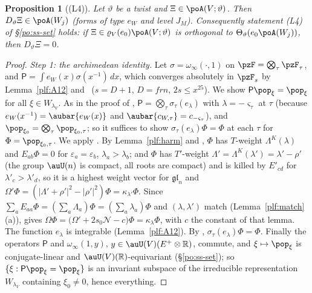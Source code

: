 \documentclass[10pt]{amsart}
\newtheorem{proposition}[theorem]{Proposition}
\theoremstyle{definition}
\theoremstyle{remark}
\newcommand{\R}{\mathbb R}
\begin{document}
\begin{proposition}[(L4)]\label{plf:L4}
Let $\vartheta$ be a twist and $\Xi\in\poA(V;\vartheta)$. Then $D_\vartheta\Xi\in\poA(W_j)$ (forms of
type $e_W$ and level $J_M$). Consequently statement {\rm(L4)} of \S\ref{po:ss-set} holds: if
$\Xi\in\varrho_V(e_0)\poA(V;\vartheta)$ is orthogonal to $\Theta_\vartheta(e_0\poA(W_j))$, then
$D_\vartheta\Xi=0$.
\end{proposition}
\begin{proof}
\emph{Step 1: the archimedean identity.} Let $\sigma=\omega_\infty(\cdot,1)$ on $\pzF=\bigotimes_\tau
\pzF_\tau$, and $\mathsf P=\int e_W(x)\sigma(x^{-1})\,dx$, which converges absolutely in $\pzF_s$ by
Lemma~\ref{plf:A12} and~{\cite[Lemma~8.2(a)]{P49}} ($s=D+1$, $D=frn$, $2s\le x^{25}$). We show
$\mathsf P\pop_\xi=\pop_\xi$ for all $\xi\in W_{\lambda_V}$. As in the proof of
{\cite[Theorem~3.15]{P49}}, $\mathsf P=\bigotimes_\tau\sigma_\tau(e_{\lambda})$ with $\lambda=-\varsigma_\tau$
at $\tau$ (because $e_W(x^{-1})=\aubar{e_W(x)}$ and $\aubar{c_{W,\tau}}=c_{-\varsigma_\tau}$), and
$\pop_{\xi_0}=\bigotimes_\tau\pop_{\xi_0,\tau}$; so it suffices to show $\sigma_\tau(e_\lambda)\Phi=
\Phi$ at each $\tau$ for $\Phi=\pop_{\xi_0,\tau}$. We apply {\cite[Lemma~3.5]{P49}}. By
Lemma~\ref{plf:harm} and {\cite[Definition~3.9]{P49}}, $\Phi$ has $T$-weight $\Lambda^K(\lambda)$
and $E_{ab}\Phi=0$ for $\varepsilon_a=\varepsilon_b$, $\lambda_a>\lambda_b$; and $\Phi$ has
$T'$-weight $\Lambda'=\Lambda^K(\lambda')=\lambda'-\rho'$ (the group $\auU(n)$ is compact, all roots
are compact) and is killed by $E'_{cd}$ for $\lambda'_c>\lambda'_d$, so it is a highest weight vector
for $\mathfrak{gl}_n$ and $\Omega'\Phi=(|\Lambda'+\rho'|^2-|\rho'|^2)\Phi=\kappa_{\lambda'}\Phi$. Since
$\sum_aE_{aa}\Phi=(\sum_a\Lambda_a)\Phi=(\sum_a\lambda_a)\Phi$ and $(\lambda,\lambda')$ match
(Lemma~\ref{plf:match}(a)), {\cite[Lemma~3.14]{P49}} gives
$\Omega\Phi=\bigl(\Omega'+2s_0\mathcal N-c\bigr)\Phi=\kappa_\lambda\Phi$, with $c$ the constant of
that lemma. The function $e_\lambda$ is integrable (Lemma~\ref{plf:A12}). By {\cite[Lemma~3.5]{P49}},
$\sigma_\tau(e_\lambda)\Phi=\Phi$. Finally the operators $\mathsf P$ and $\omega_\infty(1,y)$,
$y\in\auU(V)(E^+\otimes\R)$, commute, and $\xi\mapsto\pop_\xi$ is conjugate-linear and
$\auU(V)(\R)$-equivariant (\S\ref{po:ss-set}); so $\{\xi:\mathsf P\pop_\xi=\pop_\xi\}$ is an invariant
subspace of the irreducible representation $W_{\lambda_V}$ containing $\xi_0\ne0$, hence everything.


\end{proof}
\end{document}
